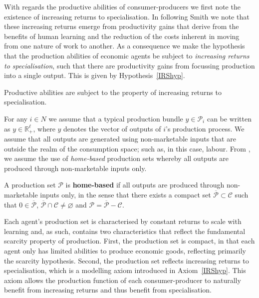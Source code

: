 With regards the productive abilities of consumer-producers we first note the existence of increasing returns to specialisation. In following Smith we note that these increasing returns emerge from productivity gains that derive from the benefits of human learning and the reduction of the costs inherent in moving from one nature of work to another. As a consequence we make the hypothesis that the production abilities of economic agents be subject to \emph{increasing returns to specialisation}, such that there are productivity gains from focussing production into a single output. This is given by Hypothesis~\ref{IRShyp}.
\begin{hypothesis} \label{IRShyp}
Productive abilities are subject to the property of increasing returns to specialisation.
\end{hypothesis}
For any $i \in N$ we assume that a typical production bundle $y \in \mathcal{P}_{i}$ can be written as $y \in \mathbb{R}^{\ell}_{+}$, where $y$ denotes the vector of outputs of $i$'s production process. We assume that all outputs are generated using non-marketable inputs that are outside the realm of the consumption space; such as, in this case, labour. From \citet{Gilles2016}, we assume the use of \emph{home-based} production sets whereby all outputs are produced through non-marketable inputs only.
\begin{definition} \label{def:home-based}
A production set $\mathcal{P}$ is \textbf{home-based} if all outputs are produced through non-marketable inputs only, in the sense that there exists a compact set $\overline{\mathcal{P}} \subset \mathcal{C}$ such that $0 \in \overline{\mathcal{P}}$, $\overline{\mathcal{P}} \cap \mathcal{C} \neq \varnothing$ and $\mathcal{P} = \overline{\mathcal{P}} - \mathcal{C}$.
\end{definition}
Each agent's production set is characterised by constant returns to scale with learning and, as such, contains two characteristics that reflect the fundamental scarcity property of production. First, the production set is compact, in that each agent only has limited abilities to produce economic goods, reflecting primarily the scarcity hypothesis. Second, the production set reflects increasing returns to specialisation, which is a modelling axiom introduced in Axiom~\ref{IRShyp}. This axiom allows the production function of each consumer-producer to naturally benefit from increasing returns and thus benefit from specialisation.


